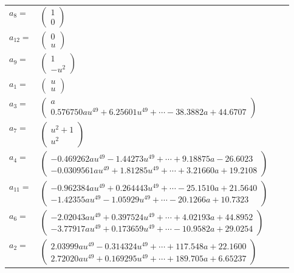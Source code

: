 \documentclass[1p]{elsarticle_modified}
\theoremstyle{definition}
\begin{document}
\begin{tabular}{m{7pt} m{180pt} m{7pt} m{180pt} }
\flushright $a_{8}=$&$\begin{pmatrix}1\\0\end{pmatrix}$ \\
\flushright $a_{12}=$&$\begin{pmatrix}0\\u\end{pmatrix}$ \\
\flushright $a_{9}=$&$\begin{pmatrix}1\\- u^2\end{pmatrix}$ \\
\flushright $a_{1}=$&$\begin{pmatrix}u\\u\end{pmatrix}$ \\
\flushright $a_{3}=$&$\begin{pmatrix}a\\0.576750 a u^{49}+6.25601 u^{49}+\cdots-38.3882 a+44.6707\end{pmatrix}$ \\
\flushright $a_{7}=$&$\begin{pmatrix}u^2+1\\u^2\end{pmatrix}$ \\
\flushright $a_{4}=$&$\begin{pmatrix}-0.469262 a u^{49}-1.44273 u^{49}+\cdots+9.18875 a-26.6023\\-0.0309561 a u^{49}+1.81285 u^{49}+\cdots+3.21660 a+19.2108\end{pmatrix}$ \\
\flushright $a_{11}=$&$\begin{pmatrix}-0.962384 a u^{49}+0.264443 u^{49}+\cdots-25.1510 a+21.5640\\-1.42355 a u^{49}-1.05929 u^{49}+\cdots-20.1266 a+10.7323\end{pmatrix}$ \\
\flushright $a_{6}=$&$\begin{pmatrix}-2.02043 a u^{49}+0.397524 u^{49}+\cdots+4.02193 a+44.8952\\-3.77917 a u^{49}+0.173659 u^{49}+\cdots-10.9582 a+29.0254\end{pmatrix}$ \\
\flushright $a_{2}=$&$\begin{pmatrix}2.03999 a u^{49}-0.314324 u^{49}+\cdots+117.548 a+22.1600\\2.72020 a u^{49}+0.169295 u^{49}+\cdots+189.705 a+6.65237\end{pmatrix}$ \\

\end{tabular}
\end{document}
